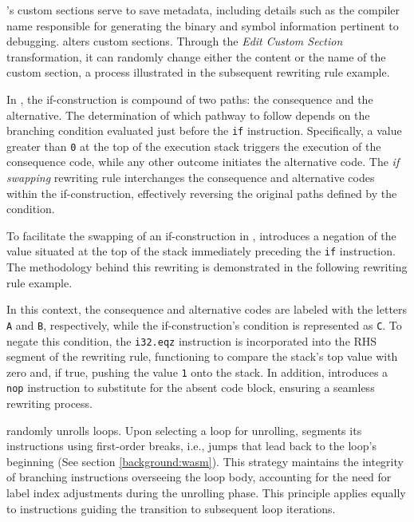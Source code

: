 


 \Wasm's custom sections serve to save metadata, including details such as the compiler name responsible for generating the binary and symbol information pertinent to debugging. 
\tool alters custom sections. 
Through the \emph{Edit Custom Section} transformation, it can randomly change either the content or the name of the custom section, a process illustrated in the subsequent rewriting rule example.




 In \Wasm, the if-construction is compound of two paths: the consequence and the alternative. 
The determination of which pathway to follow depends on the branching condition evaluated just before the \texttt{if} instruction. 
Specifically, a value greater than \texttt{0} at the top of the execution stack triggers the execution of the consequence code, while any other outcome initiates the alternative code.
The \emph{if swapping} rewriting rule interchanges the consequence and alternative codes within the if-construction, effectively reversing the original paths defined by the condition.



To facilitate the swapping of an if-construction in \Wasm, \tool introduces a negation of the value situated at the top of the stack immediately preceding the \texttt{if} instruction. 
The methodology behind this rewriting is demonstrated in the following rewriting rule example.




In this context, the consequence and alternative codes are labeled with the letters \texttt{A} and \texttt{B}, respectively, while the if-construction's condition is represented as \texttt{C}. 
To negate this condition, the \texttt{i32.eqz} instruction is incorporated into the RHS segment of the rewriting rule, functioning to compare the stack's top value with zero and, if true, pushing the value \texttt{1} onto the stack.
In addition, \tool introduces a \texttt{nop} instruction to substitute for the absent code block, ensuring a seamless rewriting process.


 \tool randomly unrolls loops.
Upon selecting a loop for unrolling, \tool segments its instructions using first-order breaks, i.e., jumps that lead back to the loop's beginning (See section \autoref{background:wasm}). 
This strategy maintains the integrity of branching instructions overseeing the loop body, accounting for the need for label index adjustments during the unrolling phase. 
This principle applies equally to instructions guiding the transition to subsequent loop iterations.

